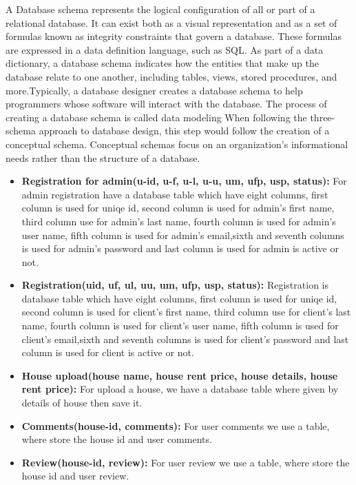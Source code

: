 \documentclass[12pt,a4paper]{article}
\newcommand\tab[1][.7cm]{\hspace*{#1}}
\begin{document}
		\tab A Database schema \cite{Ref:22} represents the logical configuration of all or part of a relational database. It can exist both as a visual representation and as a set of formulas known as integrity constraints that govern a database. These formulas are expressed in a data definition language, such as SQL. As part of a data dictionary, a database schema indicates how the entities that make up the database relate to one another, including tables, views, stored procedures, and more.Typically, a database designer creates a database schema to help programmers whose software will interact with the database. The process of creating a database schema is called data modeling When following the three-schema approach to database design, this step would follow the creation of a conceptual schema. Conceptual schemas focus on an organization’s informational needs rather than the structure of a database.

		\begin{itemize}
			\item \textbf{Registration for admin(u-id, u-f, u-l, u-u, um, ufp, usp, status):} For admin registration have a database table which have eight columns, first column is used for uniqe id, second column is used for admin's first name, third column use for admin's last name, fourth column is used for admin's user name, fifth column is used for admin's email,sixth and seventh columns is used for admin's password and last column is used for admin is active or not. 
			\item \textbf{Registration(uid, uf, ul, uu, um, ufp, usp, status):} Registration is database table which have eight columns, first column is used for uniqe id, second column is used for client's first name, third column use for client's last name, fourth column is used for client's user name, fifth column is used for client's email,sixth and seventh columns is used for client's password and last column is used for client is active or not. 
			\item \textbf{House upload(house name, house rent price, house details, house rent price):} For upload a house, we have a database table where given by details of house then save it.
			\item \textbf{Comments(house-id, comments):} For user comments we use a table, where store the house id and user comments.
			\item \textbf{Review(house-id, review):} For user review we use a table, where store the house id and user review.
		\end{itemize}
	
\end{document}
